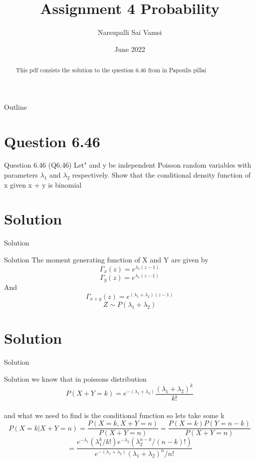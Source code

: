 \documentclass{beamer}
\title{Assignment 4 Probability}
\author{Narsupalli Sai Vamsi}
\date{June 2022}
\begin{document}
\begin{frame}
\titlepage
 \begin{abstract}
     This pdf consists the solution to the question 6.46 from in Papoulis pillai
 \end{abstract}   
\end{frame}
\begin{frame}{Outline}
\tableofcontents
\end{frame}
\section{Question 6.46}
\begin{frame}{Question 6.46}
 (Q6.46) Let" and y be independent Poisson random variables with parameters $\lambda_1$ and $\lambda_2$ respectively. Show that the conditional density function of x given x + y is binomial 
\end{frame}
\section{Solution}
\begin{frame}{Solution}
\begin{block}{Solution}
    The moment generating function of X and Y are given by\\
  $$
  \Gamma_x{(z)} = e^{\lambda_1(z-1)}
  $$
  $$
  \Gamma_y{(z)} = e^{\lambda_1(z-1)}
  $$
  And\\
  $$
  \Gamma_{x+y}{(z)} = e^{(\lambda_1+\lambda_2)(z-1)}
  $$
  $$
  Z\sim P(\lambda_1+\lambda_2)
  $$ 
\end{block}
\end{frame}
\section{Solution}
\begin{frame}{Solution}
\begin{block}{Solution}
 we know that in poissons distribution\\
 $$P(X+Y=k) = e^{-(\lambda_1+\lambda_2)} \frac{(\lambda_1+\lambda_2)^k}{k!} $$\\
 and what we need to find is the conditional function so lets take some k \\
 $$P(X=k|X+Y=n) = \frac{P(X=k,X+Y=n)}{P(X+Y=n)}
 = \frac{P(X=k)P(Y=n-k)}{P(X+Y=n)}
 $$
 $$
  =\frac{e^{-\lambda_1}(\lambda_1^k/k!)e^{-\lambda_2}(\lambda_2^{n-k}/(n-k)!)}{e^{-(\lambda_1+\lambda_2)}(\lambda_1+\lambda_2)^n/n!} 
 $$
\end{block}
\end{frame}
\end{document}
